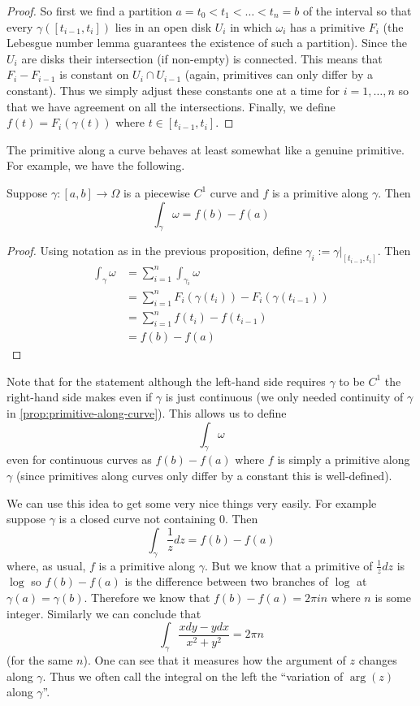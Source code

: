 \begin{proof}
    So first we find a partition $a = t_0 < t_1 < \dots < t_n = b$ of the interval so that  every $\gamma([t_{i - 1}, t_i])$ lies in an open disk $U_i$ in which $\omega_i$ has a primitive $F_i$ (the Lebesgue number lemma guarantees the existence of such a partition). Since the $U_i$ are disks their intersection (if non-empty) is connected. This means that $F_i - F_{i - 1}$ is constant on $U_i \cap U_{i - 1}$ (again, primitives can only differ by a constant). Thus we simply adjust these constants one at a time for $i = 1, \dots, n$ so that we have agreement on all the intersections. Finally, we define $f(t) = F_i(\gamma(t))$ where $t \in [t_{i - 1}, t_i]$.
\end{proof}

The primitive along a curve behaves at least somewhat like a genuine primitive. For example, we have the following.

\begin{corollary}
Suppose $\gamma: [a, b] \to \Omega$ is a piecewise $C^1$ curve and $f$ is a primitive along $\gamma$. Then
$$ \int_\gamma \omega = f(b) - f(a) $$
\end{corollary}
\begin{proof}
    Using notation as in the previous proposition, define $\gamma_i := \gamma|_{[t_{i - 1}, t_i]}$. Then
    \begin{align*}
       \int_\gamma \omega &= \sum_{i = 1}^n \int_{\gamma_i} \omega \\
       &= \sum_{i = 1}^n F_i(\gamma(t_i)) - F_i(\gamma(t_{i - 1}))\\
       &= \sum_{i = 1}^n f(t_{i}) - f(t_{i - 1})\\
       &= f(b) - f(a)
    \end{align*}
\end{proof}
Note that for the statement although the left-hand side requires $\gamma$ to be $C^1$ the right-hand side makes even if $\gamma$ is just continuous (we only needed continuity of $\gamma$ in \autoref{prop:primitive-along-curve}). This allows us to define
$$ \int_\gamma \omega $$
even for continuous curves as $f(b) - f(a)$ where $f$ is simply a primitive along $\gamma$ (since primitives along curves only differ by a constant this is well-defined).

We can use this idea to get some very nice things very easily. For example suppose $\gamma$ is a closed curve not containing 0. Then
$$ \int_{\gamma} \frac{1}{z}dz = f(b) - f(a) $$
where, as usual, $f$ is a primitive along $\gamma$. But we know that a primitive of $\frac{1}{z}dz$ is $\log$ so $f(b) - f(a)$ is the difference between two branches of $\log$ at $\gamma(a) = \gamma(b)$. Therefore we know that $f(b) - f(a) = 2\pi i n$ where $n$ is some integer. Similarly we can conclude that
$$ \int_\gamma \frac{xdy - ydx}{x^2 + y^2} = 2\pi n $$
(for the same $n$). One can see that it measures how the argument of $z$ changes along $\gamma$. Thus we often call the integral on the left the ``variation of $\arg(z)$ along $\gamma$''.

